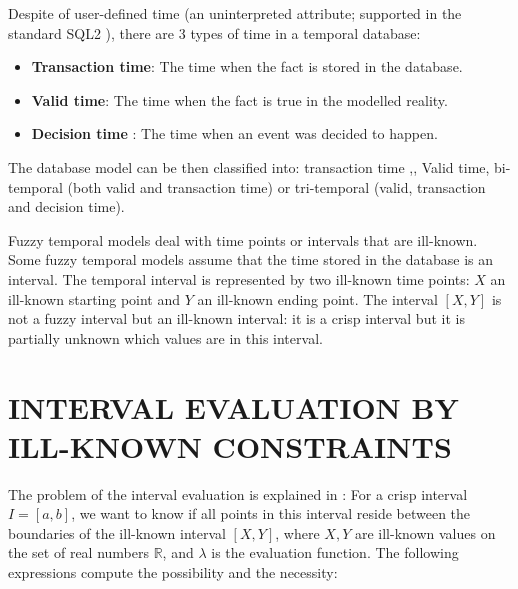 \documentclass[twoside,twocolumn,a4paper]{article}
\begin{document}


Despite of user-defined time (an uninterpreted attribute; supported in the standard SQL2 \cite{Mel93}), there are 3 types of time in a temporal database:

\begin{itemize}
	\item
	\textbf{Transaction time}: The time when the fact is stored in the database.
	\item
	\textbf{Valid time}: The time when the fact is true in the modelled reality.
	\item
	\textbf{Decision time} \cite{Nascimento95decisiontime}: The time when an event was decided to happen. 
	\end{itemize}
	
	 The  database model can be then classified into: transaction time \cite{Ston87},\cite{Jensen:1991:IIM:627283.627484}, Valid time, bi-temporal \cite{Snodgrass:1984:TQL:588011.588041}(both valid and transaction time) or tri-temporal \cite{Nascimento95decisiontime} (valid, transaction and decision time).

Fuzzy temporal models \cite{4481150} deal with time points \cite{Dubois89} or intervals \cite{Garrido2009} that are ill-known. Some fuzzy temporal models assume that the time stored in the database is an interval. The temporal interval is represented by two ill-known time points: $X$  an ill-known starting point and $Y$ an ill-known ending point. The interval $\left[X,Y\right]$ is not a fuzzy interval but an ill-known interval: it is a crisp interval but it is partially unknown which values are in this interval.




\section{\label{sec:interval-eval}INTERVAL EVALUATION BY ILL-KNOWN CONSTRAINTS}
The problem of the interval evaluation is explained in \cite{Pon11}: For a crisp interval $I = \left[ a, b \right]$, we want to know if all points in this interval reside between the boundaries of the ill-known interval $\left[ X , Y \right]$, where $X,Y$ are ill-known values on the set of real numbers $\mathbb{R}$, and $\lambda$ is the evaluation function. The following expressions compute the possibility and the necessity: 
\end{document}
